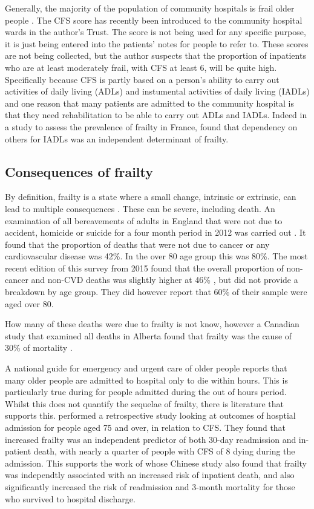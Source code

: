 \documentclass
[
	12pt,
	a4paper,
	oneside,
]{article}
\begin{document}
Generally, the majority of the population of community hospitals is frail older 
people \parencite{silver:12}.
The CFS score has recently been introduced to the community hospital wards in the author's Trust. The
score is not being used for any specific purpose, it is just being entered into 
the patients' notes for people to refer to. These scores are not being collected, 
but the author suspects that the proportion of inpatients who are at least 
moderately frail, with CFS at least 6, will be quite high. Specifically because
CFS is partly based on a person's ability to carry out activities of daily living (ADLs)
and instumental activities of daily living (IADLs) and one reason that many patients
are admitted to the community hospital is that they need rehabilitation to be
able to carry out ADLs and IADLs. Indeed in a study to assess the prevalence of frailty
in France, \textcite{cossec:16} found that dependency on others for IADLs was an 
independent determinant of frailty.

\subsection{Consequences of frailty}

By definition, frailty is a state where a small change, intrinsic or extrinsic, can
lead to multiple consequences \parencite{collard:12}. These can be severe, including 
death. An examination
of all bereavements of adults in England that were not due to accident, homicide or suicide for 
a four month period in 2012 was 
carried out \parencite{ons:13}. It found that the proportion of deaths
that were not due to cancer or any cardiovascular disease was 42\%. In the over 80
age group this was 80\%. The most recent edition of this survey from 2015 found
that the overall proportion of non-cancer and non-CVD deaths was slightly higher 
at 46\% \parencite{ons:16}, but did not provide a breakdown by age group. They 
did however report that 60\% of their sample were aged over 80.

How many of these deaths were due to frailty is not know, however 
a Canadian study that examined all deaths in Alberta found that frailty was the
cause of 30\% of mortality \parencite{fassbender:09}.

A national guide for emergency and urgent care of older people \parencite{silver:12}
reports that many older people are admitted to hospital only to die within hours.
This is particularly true during for people admitted during the out of hours period.
Whilst this does not quantify the sequelae of frailty, there is literature that 
supports this. \textcite{wallis:15} performed a retrospective study looking 
at outcomes of hosptial admission for people aged 75 and over, in relation to CFS. 
They found that increased frailty was an independent predictor of both 30-day
readmission and in-patient death, with nearly a quarter of people with CFS of 8 dying 
during the admission. This supports the work of \textcite{kang:15} whose Chinese 
study also found that frailty was independtly associated with an increased risk of 
inpatient death, and also significantly increased the risk of readmission and 
3-month mortality for those who survived to hospital discharge.
\end{document}
